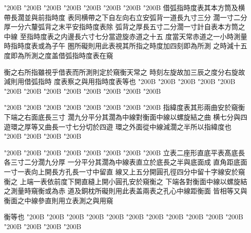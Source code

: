 \begin{正文}
\char"200B\relax{}
\char"200B\relax{}
\char"200B\relax{}
\char"200B\relax{}
\char"200B\relax{}
\char"200B\relax{}
\char"200B\relax{}
\char"200B\relax{}
借弧指時度表其本方筒及横帶長濶並與前指時度
表同横帶之下自左向右立安弧背一道長九寸三分
濶一寸二分厚一分六釐弧背之末平安指時度表除
弧背之厚長五寸二分濶一寸計自表本方筒之中線
至指時度表之内邊長六寸七分當遊旋赤道之十五
度當天常赤道之一小時測量時指時度表或為子午
圏所礙則用此表視其所指之時度加四刻即為所測
之時減十五度即為所測之度盖借弧指時度表在窺
\par
衡之右所指雖視乎借表而所測則定於窺衡天常之
時刻左旋故加三辰之度分右旋故減則用借弧指時
度表察之與用指時度表等也
\char"200B\relax{}
\char"200B\relax{}
\char"200B\relax{}
\char"200B\relax{}
\char"200B\relax{}
\char"200B\relax{}
\char"200B\relax{}
\char"200B\relax{}
\char"200B\relax{}
\char"200B\relax{}
\char"200B\relax{}
\char"200B\relax{}
\char"200B\relax
\par
\end{正文}\clearpage
{}
\begin{正文}
\char"200B\relax{}
\char"200B\relax{}
\char"200B\relax{}
\char"200B\relax{}
\char"200B\relax{}
\char"200B\relax{}
\char"200B\relax{}
\char"200B\relax{}
指緯度表其形兩曲安於窺衡下端之右面底長三寸
濶九分平分其濶為中線對衡面中線以螺旋結之曲
横七分與四遊環之厚等又曲長一寸七分切於四遊
環之外面從中線減濶之半所以指緯度也
\char"200B\relax{}
\char"200B\relax{}
\char"200B\relax{}
\char"200B\relax
\par
\end{正文}\clearpage
{}
\begin{正文}
\char"200B\relax{}
\char"200B\relax{}
\char"200B\relax{}
\char"200B\relax{}
\char"200B\relax{}
\char"200B\relax{}
\char"200B\relax{}
\char"200B\relax{}
立表二座形直底平表髙底長各三寸二分濶九分厚
一分平分其濶為中線表直立於底長之半與底面成
直角距底面一寸一表向上開長方孔長一寸中留直
線又上五分開圓孔徑四分中留十字線安於窺衡之
上端一表依前度下開直縫上開小圓孔安於窺衡之
下端各對衡面中線以螺旋結之測量時窺衡或為赤
道及銅枕所礙則用此表盖兩表之孔心中線距衡面
皆相等又與衡面之中線參直則用立表測之與用窺
\par
衡等也
\char"200B\relax{}
\char"200B\relax{}
\char"200B\relax{}
\char"200B\relax{}
\char"200B\relax{}
\char"200B\relax{}
\char"200B\relax{}
\char"200B\relax{}
\char"200B\relax{}
\char"200B\relax{}
\char"200B\relax{}
\char"200B\relax{}
\char"200B\relax{}
\char"200B\relax{}
\char"200B\relax
\par
\end{正文}\clearpage
